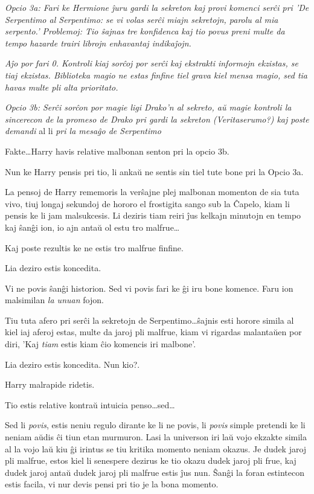 \emph{Opcio 3a: Fari ke Hermione ĵuru gardi la sekreton kaj provi komenci
serĉi pri 'De Serpentimo al Serpentimo: se vi volas serĉi miajn
sekretojn, parolu al mia serpento.' Problemoj: Tio ŝajnas tre
konfidenca kaj tio povus preni multe da tempo hazarde trairi librojn
enhavantaj indikaĵojn.}

\emph{Aĵo por fari 0. Kontroli kiaj sorĉoj por serĉi kaj ekstrakti
  informojn ekzistas, se tiaj ekzistas. Biblioteka magio ne estas
  finfine tiel grava kiel mensa magio, sed tia havas multe pli alta
  prioritato.}

\emph{Opcio 3b: Serĉi sorĉon por magie ligi Drako'n al sekreto, aŭ
  magie kontroli la sincerecon de la promeso de Drako pri gardi la
  sekreton (Veritaserumo?) kaj poste demandi} al li \emph{pri la
  mesaĝo de Serpentimo}

Fakte\ldots Harry havis relative malbonan senton pri la opcio 3b.

Nun ke Harry pensis pri tio, li ankaŭ ne sentis sin tiel tute bone pri
la Opcio 3a.

La pensoj de Harry rememoris la verŝajne plej malbonan momenton de sia
tuta vivo, tiuj longaj sekundoj de hororo el frostigita sango
sub la Ĉapelo, kiam li pensis ke li jam malsukcesis. Li deziris tiam
reiri ĵus kelkajn minutojn en tempo kaj ŝanĝi ion, io ajn antaŭ ol
estu tro malfrue\ldots

Kaj poste rezultis ke ne estis tro malfrue finfine.

Lia deziro estis koncedita.

Vi ne povis ŝanĝi historion. Sed vi povis fari ke ĝi iru bone
komence. Faru ion malsimilan \emph{la unuan} fojon.

Tiu tuta afero pri serĉi la sekretojn de Serpentimo\ldots ŝajnis esti
horore simila al kiel iaj aferoj estas, multe da jaroj pli malfrue,
kiam vi rigardas malantaŭen por diri, 'Kaj \emph{tiam} estis kiam ĉio
komencis iri malbone'.

Lia deziro estis koncedita. Nun kio?.

Harry malrapide ridetis.

Tio estis relative kontraŭ intuicia penso\ldots sed\ldots

Sed li \emph{povis}, estis neniu regulo dirante ke li ne povis, li
\emph{povis} simple pretendi ke li neniam aŭdis ĉi tiun etan
murmuron. Lasi la universon iri laŭ vojo ekzakte simila al la vojo laŭ
kiu ĝi irintus se tiu kritika momento neniam okazus. Je dudek jaroj
pli malfrue, estos kiel li senespere dezirus ke tio okazu dudek jaroj
pli frue, kaj dudek jaroj antaŭ dudek jaroj pli malfrue estis ĵus
nun. Ŝanĝi la foran estintecon estis facila, vi nur devis pensi pri
tio je la bona momento.

